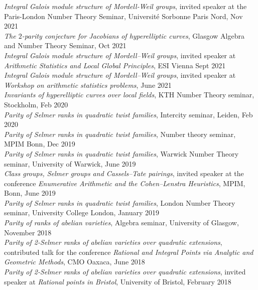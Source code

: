 \documentclass{res}
\begin{document}
\begin{resume}
{\it  Integral Galois module structure of Mordell-Weil groups}, invited speaker at the Paris-London Number Theory Seminar, Université Sorbonne Paris Nord, Nov 2021  \medskip \\
{\it  The $2$-parity conjecture for Jacobians of hyperelliptic curves}, Glasgow Algebra and Number Theory Seminar, Oct 2021    \medskip  \\
{\it  Integral Galois module structure of Mordell--Weil groups}, invited speaker at {\it Arithmetic Statistics and Local Global Principles}, ESI Vienna Sept 2021    \medskip  \\
{\it  Integral Galois module structure of Mordell--Weil groups}, invited speaker at {\it Workshop on arithmetic statistics problems}, June 2021   \medskip  \\
{\it  Invariants of hyperelliptic curves over local fields}, KTH Number Theory seminar, Stockholm, Feb 2020  \vspace{-0.18in} \medskip  \\
{\it Parity of Selmer ranks in quadratic twist families}, Intercity seminar, Leiden, Feb 2020 \medskip \\
{\it Parity of Selmer ranks in quadratic twist families}, Number theory seminar, MPIM Bonn, Dec 2019 \medskip \\
{\it Parity of Selmer ranks in quadratic twist families}, Warwick Number Theory seminar, University of Warwick, June 2019 \medskip \\
{\it Class groups, Selmer groups and Cassels--Tate pairings}, invited speaker at the conference {\it Enumerative Arithmetic and the Cohen–Lenstra Heuristics}, MPIM, Bonn, June 2019 \medskip \\
{\it Parity of Selmer ranks in quadratic twist families}, London Number Theory seminar, University College London, January 2019  \medskip \\
{\it Parity of ranks of abelian varieties}, Algebra seminar, University of Glasgow, November 2018  \medskip \\
{\it Parity of 2-Selmer ranks of abelian varieties over quadratic extensions},  contributed talk for the conference {\it Rational and Integral Points via Analytic and Geometric Methods}, CMO Oaxaca, June 2018  \medskip \\
{\it Parity of 2-Selmer ranks of abelian varieties over quadratic extensions}, invited speaker at {\it Rational points in Bristol}, University of Bristol, February 2018  \medskip \\

\end{resume}
\end{document}
